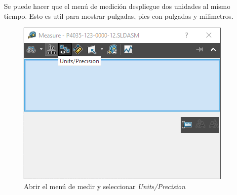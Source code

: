 \documentclass[12pt,letterpaper,final]{report}
\begin{document}
Se puede hacer que el menú de medición despliegue dos unidades al mismo tiempo. Esto es util para mostrar pulgadas, pies con pulgadas y milimetros.

\begin{figure}[H]
	\centering
	\includegraphics[width=0.55\linewidth, height=0.35\textheight,keepaspectratio]{Imagenes/solidworks_dual_units01}
	\caption{Abrir el menú de medir y seleccionar \emph{Units/Precision}}
	\label{fig:solidworksdualunits01}
\end{figure}
\end{document}
